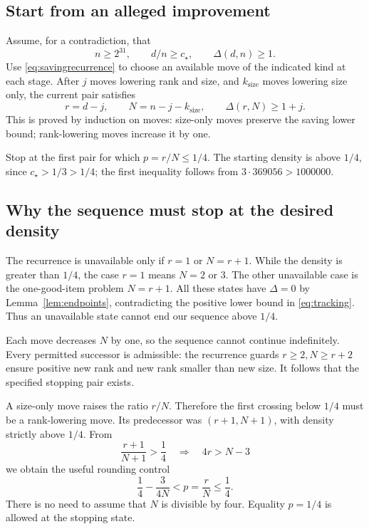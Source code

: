 \documentclass[11pt]{article}
\theoremstyle{definition}
\theoremstyle{remark}
\newcommand{\cstar}{c_\star}
\numberwithin{equation}{section}
\begin{document}
\subsection{Start from an alleged improvement}

Assume, for a contradiction, that
\[
 n\ge2^{31},\qquad d/n\ge\cstar,\qquad \Delta(d,n)\ge1.
\]
Use \eqref{eq:savingrecurrence} to choose an available move of the
indicated kind at each stage. After \(j\) moves lowering rank and
size, and \(k_{\mathrm{size}}\) moves lowering size only, the
current pair satisfies
\begin{equation}\label{eq:tracking}
 r=d-j,\qquad N=n-j-k_{\mathrm{size}},\qquad
 \Delta(r,N)\ge1+j.
\end{equation}
This is proved by induction on moves: size-only moves preserve
the saving lower bound; rank-lowering moves increase it by one.

Stop at the first pair for which \(p=r/N\le1/4\).
The starting density is above \(1/4\), since
\(\cstar>1/3>1/4\); the first inequality follows from
\(3\cdot369056>1000000\).

\subsection{Why the sequence must stop at the desired density}

The recurrence is unavailable only if \(r=1\) or \(N=r+1\).
While the density is greater than \(1/4\), the case \(r=1\) means
\(N=2\) or \(3\). The other unavailable case is the one-good-item
problem \(N=r+1\).
All these states have \(\Delta=0\) by Lemma~\ref{lem:endpoints},
contradicting the positive lower bound in \eqref{eq:tracking}.
Thus an unavailable state cannot end our sequence above \(1/4\).

Each move decreases \(N\) by one, so the sequence cannot continue
indefinitely. Every permitted successor is admissible:
the recurrence guards \(r\ge2,N\ge r+2\) ensure positive new rank
and new rank smaller than new size.
It follows that the specified stopping pair exists.

A size-only move raises the ratio \(r/N\). Therefore the first
crossing below \(1/4\) must be a rank-lowering move. Its predecessor
was \((r+1,N+1)\), with density strictly above \(1/4\).
From
\[
 \frac{r+1}{N+1}>\frac14
 \quad\Longrightarrow\quad 4r>N-3
\]
we obtain the useful rounding control
\begin{equation}\label{eq:stoppingdensity}
 \frac14-\frac{3}{4N}<p=\frac rN\le\frac14.
\end{equation}
There is no need to assume that \(N\) is divisible by four.
Equality \(p=1/4\) is allowed at the stopping state.
\end{document}

